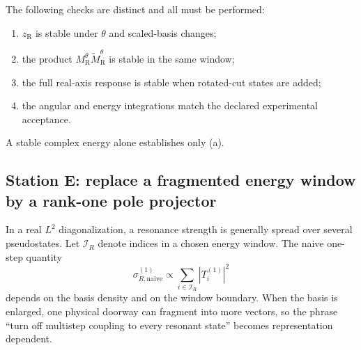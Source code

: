 The following checks are distinct and all must be performed:
\begin{enumerate}[label=(\alph*)]
  \item $z_{\mathrm R}$ is stable under $\theta$ and scaled-basis changes;
  \item the product $M_{\mathrm R}^\theta\widetilde M_{\mathrm R}^\theta$
  is stable in the same window;
  \item the full real-axis response is stable when rotated-cut states are
  added;
  \item the angular and energy integrations match the declared experimental
  acceptance.
\end{enumerate}
A stable complex energy alone establishes only (a).

\subsection{Station E: replace a fragmented energy window by a rank-one pole projector}
\label{subsec:he6-fragmented-resonance}

In a real $L^2$ diagonalization, a resonance strength is generally spread
over several pseudostates.  Let $\mathcal I_R$ denote indices in a chosen
energy window.  The naive one-step quantity
\begin{equation}
  \sigma_{R,\mathrm{naive}}^{(1)}
  \propto\sum_{i\in\mathcal I_R}|T_i^{(1)}|^2
  \label{eq:he6-naive-window-strength}
\end{equation}
depends on the basis density and on the window boundary.  When the basis is
enlarged, one physical doorway can fragment into more vectors, so the phrase
``turn off multistep coupling to every resonant state'' becomes
representation dependent.

